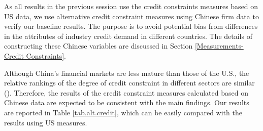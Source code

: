 \documentclass[12pt]{article}
\begin{document}
As all results in the previous session use the credit constraints measures based on US data, we use alternative credit constraint measures using Chinese firm data to verify our baseline results. The purpose is to avoid potential bias from differences in the attributes of industry credit demand in different countries. The details of constructing these Chinese variables are discussed in Section \ref{Measurements-Credit Constraints}. 

Although China's financial markets are less mature than those of the U.S., the relative rankings of the degree of credit constraint in different sectors are similar (\cite{manova2013}). Therefore, the results of the credit constraint measures calculated based on Chinese data are expected to be consistent with the main findings. Our results are reported in Table \ref{tab.alt.credit}, which can be easily compared with the results using US measures.
\end{document}
